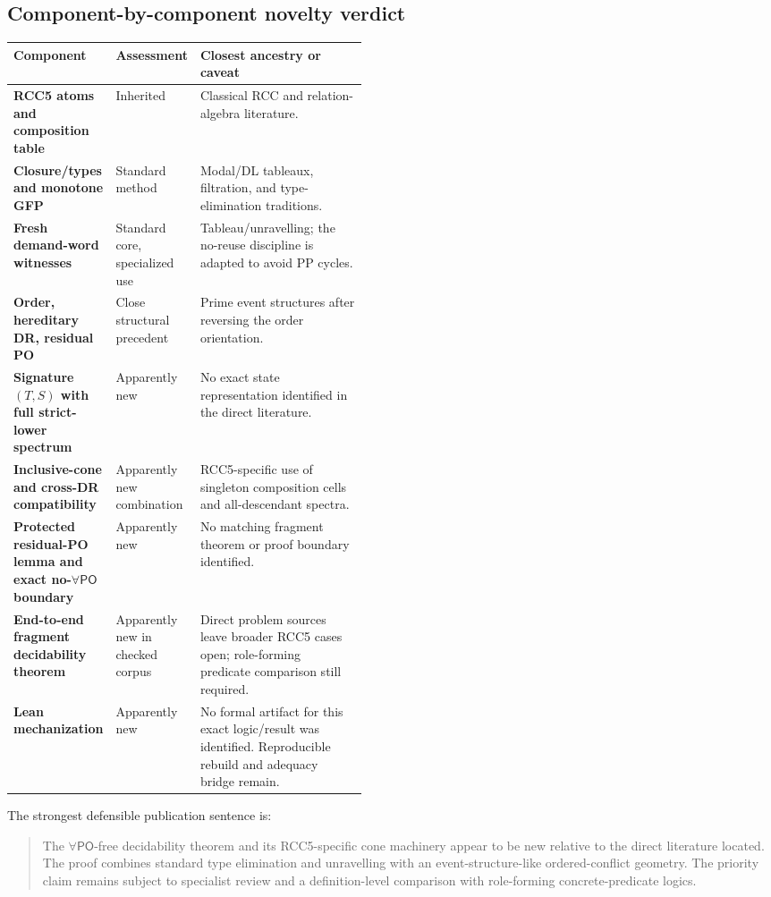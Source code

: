 \documentclass[11pt]{article}
\newcommand{\PO}{\mathsf{PO}}
\begin{document}
\subsection{Component-by-component novelty verdict}

\begin{center}
\renewcommand{\arraystretch}{1.2}
\begin{tabularx}{\linewidth}{>{\bfseries}p{0.28\linewidth}p{0.18\linewidth}X}
\toprule
Component & Assessment & Closest ancestry or caveat \\
\midrule
RCC5 atoms and composition table & Inherited & Classical RCC and relation-algebra
literature. \\
Closure/types and monotone GFP & Standard method & Modal/DL tableaux, filtration,
and type-elimination traditions. \\
Fresh demand-word witnesses & Standard core, specialized use & Tableau/unravelling;
the no-reuse discipline is adapted to avoid PP cycles. \\
Order, hereditary DR, residual PO & Close structural precedent & Prime event
structures after reversing the order orientation. \\
Signature $(T,S)$ with full strict-lower spectrum & Apparently new & No exact state
representation identified in the direct literature. \\
Inclusive-cone and cross-DR compatibility & Apparently new combination & RCC5-specific
use of singleton composition cells and all-descendant spectra. \\
Protected residual-PO lemma and exact no-$\forall\PO$ boundary & Apparently new & No
matching fragment theorem or proof boundary identified. \\
End-to-end fragment decidability theorem & Apparently new in checked corpus & Direct
problem sources leave broader RCC5 cases open; role-forming predicate comparison still
required. \\
Lean mechanization & Apparently new & No formal artifact for this exact logic/result
was identified. Reproducible rebuild and adequacy bridge remain. \\
\bottomrule
\end{tabularx}
\end{center}

The strongest defensible publication sentence is:
\begin{quote}
The $\forall\PO$-free decidability theorem and its RCC5-specific cone machinery appear
to be new relative to the direct literature located. The proof combines standard type
elimination and unravelling with an event-structure-like ordered-conflict geometry. The
priority claim remains subject to specialist review and a definition-level comparison
with role-forming concrete-predicate logics.
\end{quote}
\end{document}
